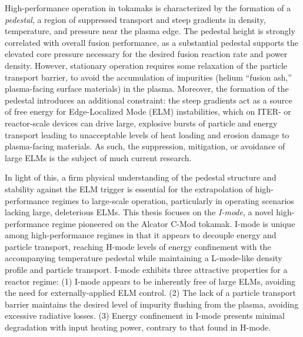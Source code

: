 High-performance operation in tokamaks is characterized by the formation of a \emph{pedestal}, a region of suppressed transport and steep gradients in density, temperature, and pressure near the plasma edge.  The pedestal height is strongly correlated with overall fusion performance, as a substantial pedestal supports the elevated core pressure necessary for the desired fusion reaction rate and power density.  However, stationary operation requires some relaxation of the particle transport barrier, to avoid the accumulation of impurities (\eg helium ``fusion ash,'' plasma-facing surface materials) in the plasma.  Moreover, the formation of the pedestal introduces an additional constraint: the steep gradients act as a source of free energy for Edge-Localized Mode (ELM) instabilities, which on ITER- or reactor-scale devices can drive large, explosive bursts of particle and energy transport leading to unacceptable levels of heat loading and erosion damage to plasma-facing materials.  As such, the suppression, mitigation, or avoidance of large ELMs is the subject of much current research.
   
In light of this, a firm physical understanding of the pedestal structure and stability against the ELM trigger is essential for the extrapolation of high-performance regimes to large-scale operation, particularly in operating scenarios lacking large, deleterious ELMs.  This thesis focuses on the \emph{I-mode}, a novel high-performance regime pioneered on the Alcator C-Mod tokamak.  I-mode is unique among high-performance regimes in that it appears to decouple energy and particle transport, reaching H-mode levels of energy confinement with the accompanying temperature pedestal while maintaining a L-mode-like density profile and particle transport.  I-mode exhibits three attractive properties for a reactor regime: (1) I-mode appears to be inherently free of large ELMs, avoiding the need for externally-applied ELM control.  (2) The lack of a particle transport barrier maintains the desired level of impurity flushing from the plasma, avoiding excessive radiative losses.  (3) Energy confinement in I-mode presents minimal degradation with input heating power, contrary to that found in H-mode.
   

